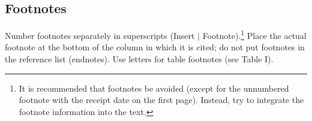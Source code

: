 \documentclass[journal]{IEEEtran}
\begin{document}
\subsection{Footnotes}

Number footnotes separately in superscripts (Insert $\mid$ Footnote).\footnote{It is recommended that footnotes be avoided (except for the unnumbered footnote with the receipt date on the first page). Instead, try to integrate the footnote information into the text.}  Place the actual footnote at the bottom of the column in which it is cited; do not put footnotes in the reference list (endnotes). Use letters for table footnotes (see Table I). 










{}

\end{document}
